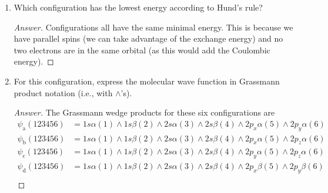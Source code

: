 \documentclass[../psets.tex]{subfiles}
\begin{document}
\begin{enumerate}
\begin{enumerate}
\begin{proof}[Answer]
\begin{figure}[h!]
\begin{subfigure}[b]{0.19\linewidth}
                    \caption{}
                \end{subfigure}
            \end{figure}
        \end{proof}
        \item Which configuration has the lowest energy according to Hund's rule?
        \begin{proof}[Answer]
            Configurations  all have the same minimal energy. This is because we have parallel spins (we can take advantage of the exchange energy) and no two electrons are in the same orbital (as this would add the Coulombic energy).
        \end{proof}
        \item For this configuration, express the molecular wave function in Grassmann product notation (i.e., with $\wedge$'s).
        \begin{proof}[Answer]
            The Grassmann wedge products for these six configurations are
            \begin{align*}
                \psi_\text{a}(123456) &= 1s\alpha(1)\wedge 1s\beta(2)\wedge 2s\alpha(3)\wedge 2s\beta(4)\wedge 2p_x\alpha(5)\wedge 2p_y\alpha(6)\\
                \psi_\text{b}(123456) &= 1s\alpha(1)\wedge 1s\beta(2)\wedge 2s\alpha(3)\wedge 2s\beta(4)\wedge 2p_x\alpha(5)\wedge 2p_z\alpha(6)\\
                \psi_\text{c}(123456) &= 1s\alpha(1)\wedge 1s\beta(2)\wedge 2s\alpha(3)\wedge 2s\beta(4)\wedge 2p_y\alpha(5)\wedge 2p_z\alpha(6)\\
                \psi_\text{d}(123456) &= 1s\alpha(1)\wedge 1s\beta(2)\wedge 2s\alpha(3)\wedge 2s\beta(4)\wedge 2p_x\beta(5)\wedge 2p_y\beta(6)\\

\end{align*}
\end{proof}
\end{enumerate}
\end{enumerate}
\end{document}
